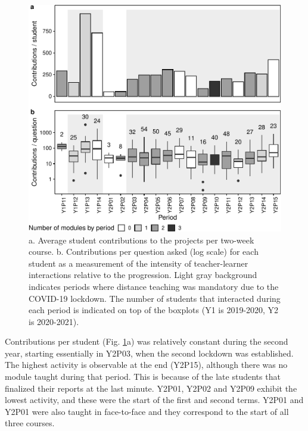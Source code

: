 \documentclass{aims}
\theoremstyle{definition}
\begin{document}
\begin{figure}
\includegraphics[width=1\linewidth]{teaching_data_science_files/figure-latex/fig_support_by_time-1} \caption{\label{fig:fig_support_by_time} a. Average student contributions to the projects per two-week course. b. Contributions per question asked (log scale) for each student as a measurement of the intensity of teacher-learner interactions relative to the progression. Light gray background indicates periods where distance teaching was mandatory due to the COVID-19 lockdown. The number of students that interacted during each period is indicated on top of the boxplots (Y1 is 2019-2020, Y2 is 2020-2021).}\label{fig:fig_support_by_time}
\end{figure}

Contributions per student (Fig. \ref {fig:fig_support_by_time}a) was
relatively constant during the second year, starting essentially in
Y2P03, when the second lockdown was established. The highest activity is
observable at the end (Y2P15), although there was no module taught
during that period. This is because of the late students that finalized
their reports at the last minute. Y2P01, Y2P02 and Y2P09 exhibit the
lowest activity, and these were the start of the first and second terms.
Y2P01 and Y2P01 were also taught in face-to-face and they correspond to
the start of all three courses.
\end{document}
